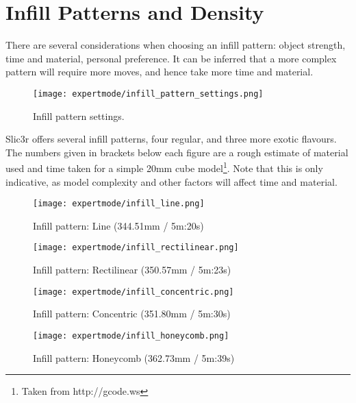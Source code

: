 
\section{Infill Patterns and Density} %
\label{sec:infill_patterns_and_density}

There are several considerations when choosing an infill pattern: object strength, time and material, personal preference.  It can be inferred that a more complex pattern will require more moves, and hence take more time and material.

\begin{figure}[H]
\centering
\texttt{[image: expertmode/infill\_pattern\_settings.png]}
\caption{Infill pattern settings.}
\label{fig:infill_pattern_settings}
\end{figure}

Slic3r offers several infill patterns, four regular, and three more exotic flavours.  The numbers given in brackets below each figure are a rough estimate of material used and time taken for a simple 20mm cube model\footnote{Taken from http://gcode.ws}.  Note that this is only indicative, as model complexity and other factors will affect time and material.

\begin{figure}[H]
\centering
\texttt{[image: expertmode/infill\_line.png]}
\caption{Infill pattern: Line (344.51mm / 5m:20s)}
\label{fig:infill_line}
\end{figure}

\begin{figure}[H]
\centering
\texttt{[image: expertmode/infill\_rectilinear.png]}
\caption{Infill pattern: Rectilinear (350.57mm / 5m:23s)}
\label{fig:infill_rectilinear}
\end{figure}

\begin{figure}[H]
\centering
\texttt{[image: expertmode/infill\_concentric.png]}
\caption{Infill pattern: Concentric (351.80mm / 5m:30s)}
\label{fig:infill_concentric}
\end{figure}

\begin{figure}[H]
\centering
\texttt{[image: expertmode/infill\_honeycomb.png]}
\caption{Infill pattern: Honeycomb (362.73mm / 5m:39s)}
\label{fig:infill_honeycomb}
\end{figure}

